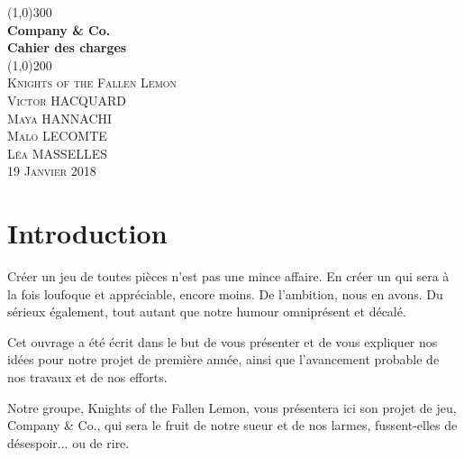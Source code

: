 \documentclass{article}
\begin{document}
\begin{titlepage} 
	\begin{center}
	\line(1,0){300}\\
	[2mm]
	\huge{\bfseries Company \& Co. \\Cahier des charges}\\
	[1mm]
	\line(1,0){200}\\
	[1.5 cm]
	\textsc{\LARGE Knights of the Fallen Lemon}\\
	[0.75 cm]
	\textsc{\Large Victor HACQUARD\\Maya HANNACHI\\Malo LECOMTE\\Léa MASSELLES}\\
	[1 cm]
	\textsc{\large 19 Janvier 2018}
	\end{center}
\end{titlepage}

\tableofcontents
\newpage

\section*{Introduction}
Créer un jeu de toutes pièces n'est pas une mince affaire. En créer un qui sera à la fois loufoque et appréciable, encore moins.
De l'ambition, nous en avons. Du sérieux également, tout autant que notre humour omniprésent et décalé.

Cet ouvrage a été écrit dans le but de vous présenter et de vous expliquer nos idées pour notre projet de première année, ainsi que l'avancement probable de nos travaux et de nos efforts.

Notre groupe, Knights of the Fallen Lemon, vous présentera ici son projet de jeu, Company \& Co., qui sera le fruit de notre sueur et de nos larmes, fussent-elles de désespoir... ou de rire.
\end{document}
